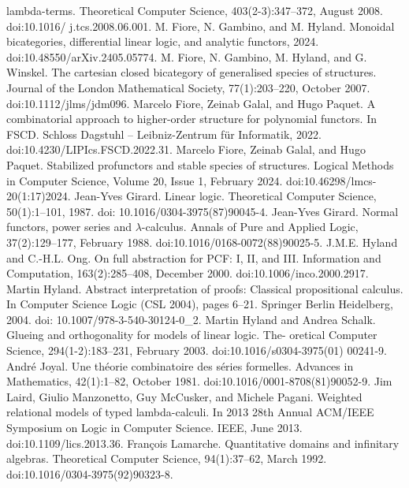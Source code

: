 lambda-terms. Theoretical Computer Science, 403(2-3):347–372, August 2008. doi:10.1016/
j.tcs.2008.06.001.
 M. Fiore, N. Gambino, and M. Hyland. Monoidal bicategories, differential linear logic, and
analytic functors, 2024. doi:10.48550/arXiv.2405.05774.
 M. Fiore, N. Gambino, M. Hyland, and G. Winskel. The cartesian closed bicategory of
generalised species of structures. Journal of the London Mathematical Society, 77(1):203–220,
October 2007. doi:10.1112/jlms/jdm096.
 Marcelo Fiore, Zeinab Galal, and Hugo Paquet. A combinatorial approach to higher-order
structure for polynomial functors. In FSCD. Schloss Dagstuhl – Leibniz-Zentrum für Informatik,
2022. doi:10.4230/LIPIcs.FSCD.2022.31.
 Marcelo Fiore, Zeinab Galal, and Hugo Paquet. Stabilized profunctors and stable species
of structures. Logical Methods in Computer Science, Volume 20, Issue 1, February 2024.
doi:10.46298/lmcs-20(1:17)2024.
 Jean-Yves Girard. Linear logic. Theoretical Computer Science, 50(1):1–101, 1987. doi:
10.1016/0304-3975(87)90045-4.
 Jean-Yves Girard. Normal functors, power series and \ensuremath{\lambda}-calculus. Annals of Pure and Applied
Logic, 37(2):129–177, February 1988. doi:10.1016/0168-0072(88)90025-5.
 J.M.E. Hyland and C.-H.L. Ong. On full abstraction for PCF: I, II, and III. Information and
Computation, 163(2):285–408, December 2000. doi:10.1006/inco.2000.2917.
 Martin Hyland. Abstract interpretation of proofs: Classical propositional calculus. In
Computer Science Logic (CSL 2004), pages 6–21. Springer Berlin Heidelberg, 2004. doi:
10.1007/978-3-540-30124-0\_2.
 Martin Hyland and Andrea Schalk. Glueing and orthogonality for models of linear logic. The-
oretical Computer Science, 294(1-2):183–231, February 2003. doi:10.1016/s0304-3975(01)
00241-9.
 André Joyal. Une théorie combinatoire des séries formelles. Advances in Mathematics,
42(1):1–82, October 1981. doi:10.1016/0001-8708(81)90052-9.
 Jim Laird, Giulio Manzonetto, Guy McCusker, and Michele Pagani. Weighted relational
models of typed lambda-calculi. In 2013 28th Annual ACM/IEEE Symposium on Logic in
Computer Science. IEEE, June 2013. doi:10.1109/lics.2013.36.
 François Lamarche. Quantitative domains and infinitary algebras. Theoretical Computer
Science, 94(1):37–62, March 1992. doi:10.1016/0304-3975(92)90323-8.
